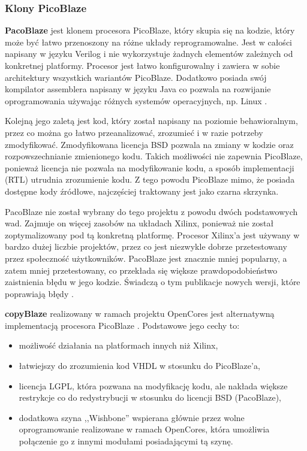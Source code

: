 \subsubsection{Klony PicoBlaze}


\textbf{PacoBlaze} jest klonem procesora PicoBlaze, który skupia się na kodzie, który może być łatwo przenoszony na różne układy reprogramowalne. Jest w całości napisany w języku Verilog i nie wykorzystuje żadnych elementów zależnych od konkretnej platformy. Procesor jest łatwo konfigurowalny i zawiera w sobie architektury wszystkich wariantów PicoBlaze. Dodatkowo posiada swój kompilator assemblera napisany w języku Java co pozwala na rozwijanie oprogramowania używając różnych systemów operacyjnych, np. Linux \cite{PacoBlaze}.


Kolejną jego zaletą jest kod, który został napisany na poziomie behawioralnym, przez co można go łatwo przeanalizować, zrozumieć i w razie potrzeby zmodyfikować. Zmodyfikowana licencja BSD pozwala na zmiany w kodzie oraz rozpowszechnianie zmienionego kodu. Takich możliwości nie zapewnia PicoBlaze, ponieważ licencja nie pozwala na modyfikowanie kodu, a sposób implementacji (RTL) utrudnia zrozumienie kodu. Z tego powodu PicoBlaze mimo, że posiada dostępne kody źródłowe, najczęściej traktowany jest jako czarna skrzynka.


PacoBlaze nie został wybrany do tego projektu z powodu dwóch podstawowych wad. Zajmuje on więcej zasobów na układach Xilinx, ponieważ nie został zoptymalizowany pod tą konkretną platformę. Procesor Xilinx'a jest używany w bardzo dużej liczbie projektów, przez co jest niezwykle dobrze przetestowany przez społeczność użytkowników. PacoBlaze jest znacznie mniej popularny, a zatem mniej przetestowany, co przekłada się większe prawdopodobieństwo zaistnienia błędu w jego kodzie. Świadczą o tym publikacje nowych wersji, które poprawiają błędy \cite{PacoBlaze}.


\textbf{copyBlaze} realizowany w ramach projektu OpenCores jest alternatywną implementacją procesora PicoBlaze \cite{copyBlaze}. Podstawowe jego cechy to:

\begin{itemize}
	\item		możliwość działania na platformach innych niż Xilinx,
	\item		łatwiejszy do zrozumienia kod VHDL w stosunku do PicoBlaze'a,
	\item		licencja LGPL, która pozwana na modyfikację kodu, ale nakłada większe restrykcje co do redystrybucji w stosunku do licencji BSD (PacoBlaze),
	\item		dodatkowa szyna ,,Wishbone'' wspierana głównie przez wolne oprogramowanie realizowane w ramach OpenCores, która umożliwia połączenie go z innymi modułami posiadającymi tą szynę.
\end{itemize}


